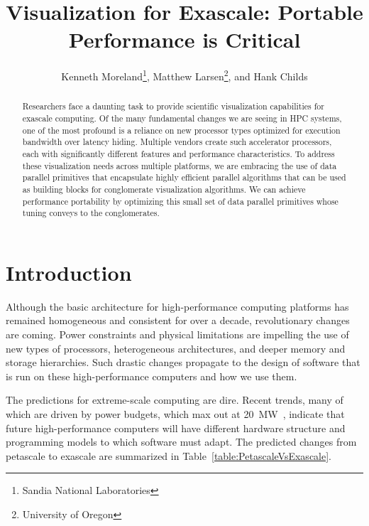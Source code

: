 \documentclass{superfri}
\newcommand*{\lcite}[1]{~\cite{#1}}
\begin{document}
\author{
  Kenneth Moreland\footnote{Sandia National Laboratories},
  Matthew Larsen\footnote{\label{ou}University of Oregon}, and
  Hank Childs
  }

\title{Visualization for Exascale: Portable Performance is Critical}

\maketitle{}

\begin{abstract}%
  \noindent
  Researchers face a daunting task to provide scientific visualization
  capabilities for exascale computing. Of the many fundamental changes we
  are seeing in HPC systems, one of the most profound is a reliance on new
  processor types optimized for execution bandwidth over latency hiding.
  Multiple vendors create such accelerator processors, each with
  significantly different features and performance characteristics. To
  address these visualization needs across multiple platforms, we are
  embracing the use of data parallel primitives that encapsulate highly
  efficient parallel algorithms that can be used as building blocks for
  conglomerate visualization algorithms. We can achieve performance
  portability by optimizing this small set of data parallel primitives
  whose tuning conveys to the conglomerates.

\end{abstract}


\section*{Introduction}
\label{sec:Introduction}

\noindent
Although the basic architecture for high-performance computing platforms has
remained homogeneous and consistent for over a decade, revolutionary changes
are coming. Power constraints and physical limitations are impelling the
use of new types of processors, heterogeneous architectures, and deeper
memory and storage hierarchies. Such drastic changes propagate to the
design of software that is run on these high-performance computers and how
we use them.

The predictions for extreme-scale computing are dire.  Recent trends, many
of which are driven by power budgets, which max out at
20~MW\lcite{ExascaleArchitecturesReport}, indicate that future
high-performance computers will have different hardware structure and
programming models to which software must adapt. The predicted changes from
petascale to exascale are summarized in
Table~\ref{table:PetascaleVsExascale}.
\end{document}
